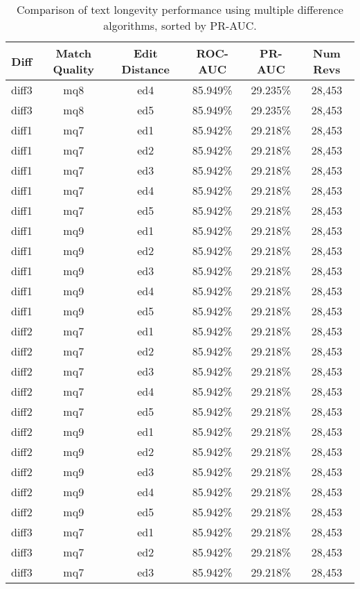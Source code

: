 \begin{table}[tbph]
\begin{center}
\begin{tabular}{|c|c|c||c|c|c|}
\hline
Diff & Match Quality & Edit Distance & ROC-AUC & PR-AUC & Num Revs \\
\hline
\hline
diff3 & mq8 & ed4 & 85.949\% & 29.235\% & 28,453 \\
diff3 & mq8 & ed5 & 85.949\% & 29.235\% & 28,453 \\
diff1 & mq7 & ed1 & 85.942\% & 29.218\% & 28,453 \\
diff1 & mq7 & ed2 & 85.942\% & 29.218\% & 28,453 \\
diff1 & mq7 & ed3 & 85.942\% & 29.218\% & 28,453 \\
diff1 & mq7 & ed4 & 85.942\% & 29.218\% & 28,453 \\
diff1 & mq7 & ed5 & 85.942\% & 29.218\% & 28,453 \\
diff1 & mq9 & ed1 & 85.942\% & 29.218\% & 28,453 \\
diff1 & mq9 & ed2 & 85.942\% & 29.218\% & 28,453 \\
diff1 & mq9 & ed3 & 85.942\% & 29.218\% & 28,453 \\
diff1 & mq9 & ed4 & 85.942\% & 29.218\% & 28,453 \\
diff1 & mq9 & ed5 & 85.942\% & 29.218\% & 28,453 \\
diff2 & mq7 & ed1 & 85.942\% & 29.218\% & 28,453 \\
diff2 & mq7 & ed2 & 85.942\% & 29.218\% & 28,453 \\
diff2 & mq7 & ed3 & 85.942\% & 29.218\% & 28,453 \\
diff2 & mq7 & ed4 & 85.942\% & 29.218\% & 28,453 \\
diff2 & mq7 & ed5 & 85.942\% & 29.218\% & 28,453 \\
diff2 & mq9 & ed1 & 85.942\% & 29.218\% & 28,453 \\
diff2 & mq9 & ed2 & 85.942\% & 29.218\% & 28,453 \\
diff2 & mq9 & ed3 & 85.942\% & 29.218\% & 28,453 \\
diff2 & mq9 & ed4 & 85.942\% & 29.218\% & 28,453 \\
diff2 & mq9 & ed5 & 85.942\% & 29.218\% & 28,453 \\
diff3 & mq7 & ed1 & 85.942\% & 29.218\% & 28,453 \\
diff3 & mq7 & ed2 & 85.942\% & 29.218\% & 28,453 \\
diff3 & mq7 & ed3 & 85.942\% & 29.218\% & 28,453 \\
\hline
\end{tabular}
\end{center}
\caption{Comparison of text longevity performance using
    multiple difference algorithms, sorted by PR-AUC.}
\label{tab:textshout}
\end{table}

